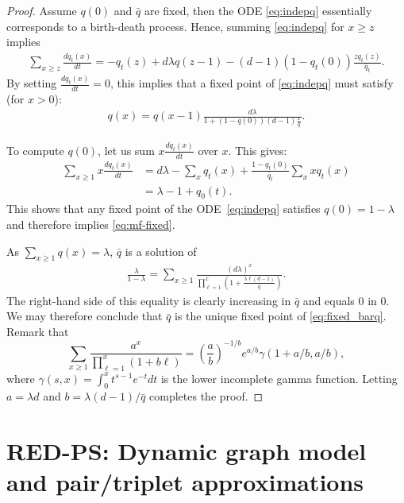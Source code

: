 \documentclass[acmsmall,nonacm]{acmart}
\begin{document}
\begin{proof}
    Assume $q(0)$ and $\bar{q}$ are fixed, then the ODE \eqref{eq:indepq} essentially corresponds to a birth-death process. Hence, summing \eqref{eq:indepq} for $x \geq z$ implies
    \begin{align*}
        \sum_{x \geq z} \frac{d q_t(x)}{dt}  = -q_t(z) + d \lambda q(z-1) - (d-1)(1-q_t(0))\frac{z q_t(z)}{\bar q_t}.
    \end{align*}
    By setting $\frac{d q_t(x)}{dt}=0$, this implies that a fixed point of \eqref{eq:indepq} must satisfy (for $x>0$):
    \begin{align}\label{eq:sum_indep0}
        q(x) = q(x-1) \frac{d\lambda}{1 + (1-q(0))(d-1)\frac{x}{\bar{q}}}.
    \end{align}
    
    To compute $q(0)$, let us sum $x\frac{d q_t(x)}{dt}$ over $x$. This gives: 
    \begin{align}\label{eq:sum_indep}
        \sum_{x\ge1} x \frac{d q_t(x)}{dt}  
        & =  d \lambda - \sum_x q_t(x) + \frac{1-q_t(0)}{\bar q_t} \sum_x x q_t(x) \nonumber \\
        &= \lambda - 1+q_0(t).
    \end{align}
    This shows that any fixed point of the ODE~\eqref{eq:indepq} satisfies $q(0) = 1 - \lambda$ and therefore implies \eqref{eq:mf-fixed}.
    
    As $\sum_{x\geq 1} q(x)=\lambda$, $\bar q$ is a solution of
    \begin{align}\label{eq:fixed_barq}
        \frac{\lambda}{1-\lambda} =   \sum_{x \geq 1} \frac{(d\lambda)^x}{\prod_{\ell = 1}^x (1+\frac{\lambda \ell(d-1)}{\bar q})}. 
    \end{align}
    The right-hand side of this equality is clearly increasing in $\bar q$ and equals $0$ in $0$. We may therefore
    conclude that $\bar q$ is the unique fixed point of \eqref{eq:fixed_barq}.
    Remark that
    \[ \sum_{x\geq 1} \frac{a^x}{\prod_{\ell=1}^x (1+b \ell)} = 
    \left(\frac{a}{b}\right)^{-1/b} e^{a/b} \gamma(1+a/b,a/b),\]
    where $\gamma(s,x) = \int_0^x t^{s-1} e^{-t} dt$ is the lower incomplete gamma function.
    Letting $a=\lambda d$ and $b=\lambda (d-1)/\bar q$ completes the proof.
\end{proof}

\section{RED-PS: Dynamic graph model and pair/triplet approximations}
\label{sec:PS-approx}
\end{document}
